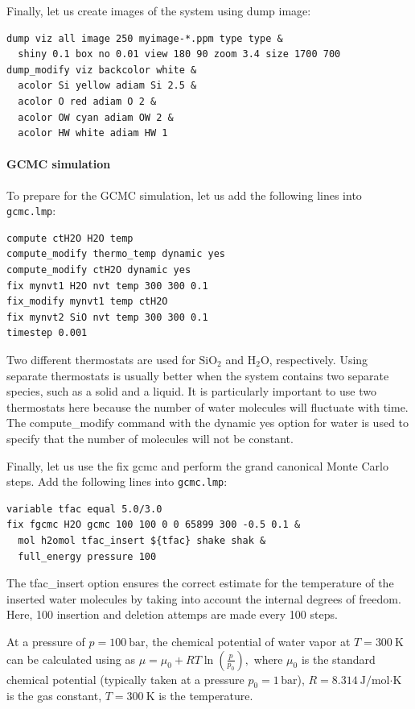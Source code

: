 \documentclass[9pt,tutorial]{livecoms}
\newcommand{\lmpcmd}[1]{\hspace{0pt}\colorbox{listing}{\textcolor{command}{\small{#1}}}\hspace{0pt}} %
\newcommand{\flecmd}[1]{\textcolor{command}{\texttt{#1}}} %
\begin{document}
Finally, let us create images
of the system using \lmpcmd{dump image}:
\begin{lstlisting}
dump viz all image 250 myimage-*.ppm type type &
  shiny 0.1 box no 0.01 view 180 90 zoom 3.4 size 1700 700
dump_modify viz backcolor white &
  acolor Si yellow adiam Si 2.5 &
  acolor O red adiam O 2 &
  acolor OW cyan adiam OW 2 &
  acolor HW white adiam HW 1
\end{lstlisting}

\paragraph{GCMC simulation}

To prepare for the GCMC simulation, let us add the
following lines into \flecmd{gcmc.lmp}:
\begin{lstlisting}
compute ctH2O H2O temp
compute_modify thermo_temp dynamic yes
compute_modify ctH2O dynamic yes
fix mynvt1 H2O nvt temp 300 300 0.1
fix_modify mynvt1 temp ctH2O
fix mynvt2 SiO nvt temp 300 300 0.1
timestep 0.001
\end{lstlisting}
Two different thermostats are used for $\text{SiO}_2$ and $\text{H}_2\text{O}$,
respectively.  Using separate thermostats is usually better when the system contains
two separate species, such as a solid and a liquid.  It is particularly important
to use two thermostats here because the number of water molecules will fluctuate
with time.  The \lmpcmd{compute\_modify} command with the \lmpcmd{dynamic yes}
option for water is used to specify that the number of molecules will not be constant.

Finally, let us use the \lmpcmd{fix gcmc} and perform the grand canonical Monte
Carlo steps.  Add the following lines into \flecmd{gcmc.lmp}:
\begin{lstlisting}
variable tfac equal 5.0/3.0
fix fgcmc H2O gcmc 100 100 0 0 65899 300 -0.5 0.1 &
  mol h2omol tfac_insert ${tfac} shake shak &
  full_energy pressure 100
\end{lstlisting}
The \lmpcmd{tfac\_insert} option ensures the correct estimate for the temperature
of the inserted water molecules by taking into account the internal degrees of
freedom.  Here, 100 insertion and deletion attemps are made every 100 steps.

\begin{note}
At a pressure of $p = 100\ \text{bar}$, the chemical potential of water vapor at $T = 300\ \text{K}$
can be calculated using as $\mu = \mu_0 + RT \ln (\frac{p}{p_0}),$ where $\mu_0$ is the standard
chemical potential (typically taken at a pressure $p_0 = 1 \, \text{bar}$), \(R = 8.314\ \text{J/mol·K}\)
is the gas constant, \(T = 300\ \text{K}\) is the temperature.
\end{note}
\end{document}

